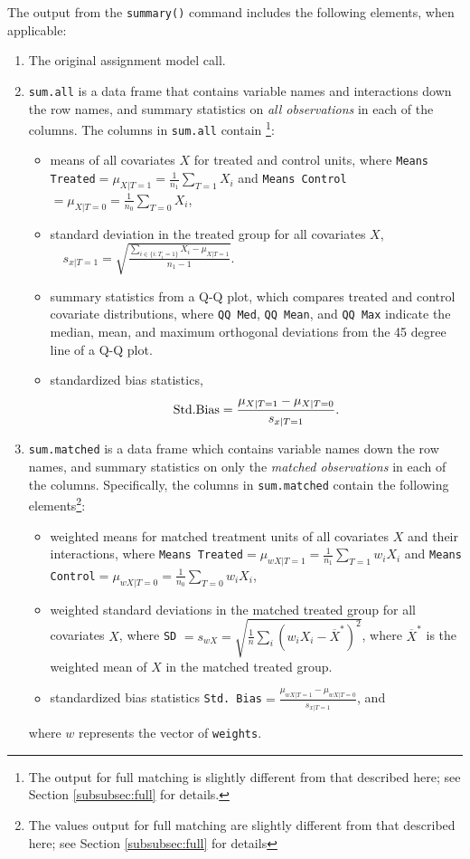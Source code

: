 \documentclass[oneside,letterpaper,titlepage]{article}
\begin{document}
The output from the \texttt{summary()} command includes the following
elements, when applicable:
\begin{enumerate}
\item The original assignment model call.
\item \texttt{sum.all} is a data frame that contains variable names
  and interactions down the row names, and summary statistics on
  \emph{all observations} in each of the columns.  The columns in
  \texttt{sum.all} contain \footnote{The output for full matching is
    slightly different from that described here; see Section
    \ref{subsubsec:full} for details.}:
  \begin{itemize}
  \item means of all covariates $X$ for treated and control units,
    where \texttt{Means Treated}$= \mu_{X|T=1} = \frac{1}{n_1}
    \sum_{T=1} X_i$ and \texttt{Means Control}$= \mu_{X|T=0} =
    \frac{1}{n_0} \sum_{T=0} X_i$,
  \item standard deviation in the treated group for all covariates $X$,  
        $\quad s_{x|T=1} = \sqrt{\frac{\sum_{i \in \{i: T_i=1\}}
        X_i - \mu_{X|T=1}}{n_1-1} }.$
  \item summary statistics from a Q-Q plot, which compares treated and
    control covariate distributions, where \texttt{QQ Med}, \texttt{QQ
      Mean}, and \texttt{QQ Max} indicate the median, mean, and
    maximum orthogonal deviations from the 45 degree line of a Q-Q
    plot.
  \item standardized bias statistics, $${\rm Std.
      Bias}=\frac{\mu_{X|T=1} - \mu_{X|T=0}}{s_{x|T=1}}.$$
  \end{itemize}
  
\item \texttt{sum.matched} is a data frame which contains variable
  names down the row names, and summary statistics on only the
  \emph{matched observations} in each of the columns.  Specifically,
  the columns in \texttt{sum.matched} contain the following
  elements\footnote{The values output for full matching are slightly
    different from that described here; see Section \ref{subsubsec:full}
    for details}:
  \begin{itemize}
  \item weighted means for matched treatment units of all covariates
    $X$ and their interactions, where \texttt{Means Treated}$=
    \mu_{wX|T=1} = \frac{1}{n_1} \sum_{T=1} w_iX_i$ and \texttt{Means
      Control}$=\mu_{wX|T=0} = \frac{1}{n_0} \sum_{T=0} w_iX_i$,
  \item weighted standard deviations in the matched treated group 
   for all covariates $X$, where \texttt{SD} $= 
    s_{wX} =
    \sqrt{\frac{1}{n} \sum_{i} (w_iX_i - \overline{X}^*)^2}$, where
    $\overline{X}^*$ is the weighted mean of $X$ in the matched treated group.
  \item standardized bias statistics \texttt{Std.
      Bias}$=\frac{\mu_{wX|T=1} - \mu_{wX|T=0}}{s_{x|T=1}}$, and
  \end{itemize}
  where $w$ represents the vector of \texttt{weights}.
  

\end{enumerate}
\end{document}
